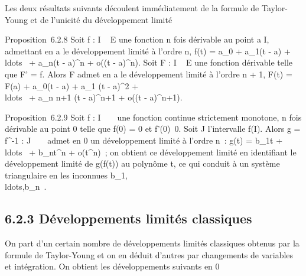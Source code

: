 \documentclass[]{article}
\begin{document}
Les deux résultats suivants découlent immédiatement de la formule de
Taylor-Young et de l'unicité du développement limité

Proposition~6.2.8 Soit f : I \rightarrow~ E une fonction n fois dérivable au point
a \in I, admettant en a le développement limité à l'ordre n, f(t) =
a_0 + a_1(t - a) +
\\ldots~ +
a_n(t - a)^n + o((t - a)^n). Soit F : I \rightarrow~
E une fonction dérivable telle que F' = f. Alors F admet en a le
développement limité à l'ordre n + 1, F(t) = F(a) + a_0(t - a)
+ a_1  (t - a)^2 +
\\ldots~ +
a_n \over n+1 (t - a)^n+1 + o((t
- a)^n+1).

Proposition~6.2.9 Soit f : I \rightarrow~ ~ une fonction continue strictement
monotone, n fois dérivable au point 0 telle que f(0) = 0 et
f'(0)\neq~0. Soit J l'intervalle f(I). Alors g =
f^-1 : J \rightarrow~ ~ admet en 0 un développement limité à l'ordre n~:
g(t) = b_1t +
\\ldots~ +
b_nt^n + o(t^n)~; on obtient ce
développement limité en identifiant le développement limité de g(f(t))
au polynôme t, ce qui conduit à un système triangulaire en les inconnues
b_1,\\ldots,b_n~.

\subsection{6.2.3 Développements limités classiques}

On part d'un certain nombre de développements limités classiques obtenus
par la formule de Taylor-Young et on en déduit d'autres par changements
de variables et intégration. On obtient les développements suivants en 0
\end{document}
